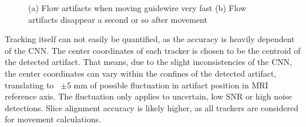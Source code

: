 \documentclass[conference]{IEEEtran}
\begin{document}
\begin{figure}[h]
\begin{minipage}{0.241\textwidth}
    \end{minipage}\hfill \hspace*{0cm}
    \caption{(a) Flow artifacts when moving guidewire very fast
    (b) Flow artifacts disappear a second or so after movement}
    \label{fig:flow-artifacts-tracking}
\end{figure}

Tracking itself can not easily be quantified, as the accuracy is heavily dependent of the CNN. The center coordinates of each tracker is chosen to be the centroid of the detected artifact. That means, due to the slight inconsistencies of the CNN, the center coordinates can vary within the confines of the detected artifact, translating to ~$\pm$5 mm of possible fluctuation in artifact position in MRI reference axis. The fluctuation only applies to uncertain, low SNR or high noise detections. Slice alignment accuracy is likely higher, as all trackers are considered for movement calculations.
\end{document}
